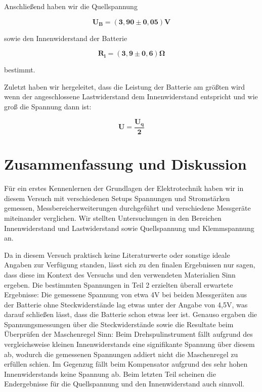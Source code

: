 \documentclass{article}
\begin{document}
Anschließend haben wir die Quellspannung 

\begin{equation}
    \bm{U_B} = \bm{(3,90 \pm 0,05)\textbf{V}}
\end{equation}

sowie den Innenwiderstand der Batterie

\begin{equation}
    \bm{R_i} = \bm{(3,9 \pm 0,6) \Omega}
\end{equation}

bestimmt.

Zuletzt haben wir hergeleitet, dass die Leistung der Batterie am größten wird wenn der angeschlossene Lastwiderstand dem Innenwiderstand entspricht und wie groß die Spannung dann ist:


\begin{equation}
    \bm{U} = \bm{\frac{U_q}{2}}
\end{equation}

\newpage
\section{Zusammenfassung und Diskussion}

Für ein erstes Kennenlernen der Grundlagen der Elektrotechnik haben wir in diesem Versuch mit verschiedenen Setups Spannungen und Stromstärken gemessen, Messbereicherweiterungen durchgeführt und verschiedene Messgeräte miteinander verglichen. Wir stellten Untersuchungen in den Bereichen Innenwiderstand und Lastwiderstand sowie Quellspannung und Klemmspannung an.

Da in diesem Versuch praktisch keine Literaturwerte oder sonstige ideale Angaben zur Verfügung standen, lässt sich zu den finalen Ergebnissen nur sagen, dass diese im Kontext des Versuchs und den verwendeten Materialien Sinn ergeben. Die bestimmten Spannungen in Teil 2 erzielten überall erwartete Ergebnisse: Die gemessene Spannung von etwa 4V bei beiden Messgeräten aus der Batterie ohne Steckwiderstände lag etwas unter der Angabe von 4,5V, was darauf schließen lässt, dass die Batterie schon etwas leer ist. Genauso ergaben die Spannungsmessungen über die Steckwiderstände sowie die Resultate beim Überprüfen der Maschenregel Sinn: Beim Drehspulinstrument fällt aufgrund des vergleichsweise kleinen Innenwiderstands eine signifikante Spannung über diesem ab, wodurch die gemessenen Spannungen addiert nicht die Maschenregel zu erfüllen schien. Im Gegenzug fällt beim Kompensator aufgrund des sehr hohen Innenwiderstands keine Spannung ab. Beim letzten Teil scheinen die Endergebnisse für die Quellspannung und den Innenwiderstand auch sinnvoll.
\end{document}
